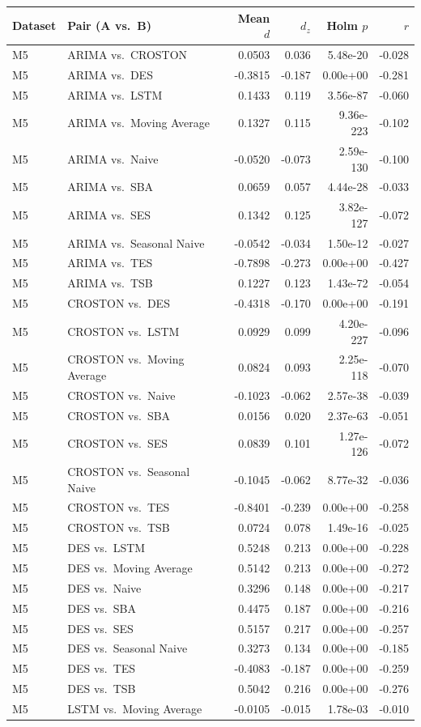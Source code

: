 {\scriptsize
\setlength\tabcolsep{4pt}
\begin{tabular}{llrrrr}
\toprule Dataset & Pair (A vs.~B) & Mean $d$ & $d_z$ & Holm $p$ & $r$ \\
\midrule
M5 & ARIMA vs.~CROSTON & 0.0503 & 0.036 & 5.48e-20 & -0.028 \\
M5 & ARIMA vs.~DES & -0.3815 & -0.187 & 0.00e+00 & -0.281 \\
M5 & ARIMA vs.~LSTM & 0.1433 & 0.119 & 3.56e-87 & -0.060 \\
M5 & ARIMA vs.~Moving Average & 0.1327 & 0.115 & 9.36e-223 & -0.102 \\
M5 & ARIMA vs.~Naive & -0.0520 & -0.073 & 2.59e-130 & -0.100 \\
M5 & ARIMA vs.~SBA & 0.0659 & 0.057 & 4.44e-28 & -0.033 \\
M5 & ARIMA vs.~SES & 0.1342 & 0.125 & 3.82e-127 & -0.072 \\
M5 & ARIMA vs.~Seasonal Naive & -0.0542 & -0.034 & 1.50e-12 & -0.027 \\
M5 & ARIMA vs.~TES & -0.7898 & -0.273 & 0.00e+00 & -0.427 \\
M5 & ARIMA vs.~TSB & 0.1227 & 0.123 & 1.43e-72 & -0.054 \\
M5 & CROSTON vs.~DES & -0.4318 & -0.170 & 0.00e+00 & -0.191 \\
M5 & CROSTON vs.~LSTM & 0.0929 & 0.099 & 4.20e-227 & -0.096 \\
M5 & CROSTON vs.~Moving Average & 0.0824 & 0.093 & 2.25e-118 & -0.070 \\
M5 & CROSTON vs.~Naive & -0.1023 & -0.062 & 2.57e-38 & -0.039 \\
M5 & CROSTON vs.~SBA & 0.0156 & 0.020 & 2.37e-63 & -0.051 \\
M5 & CROSTON vs.~SES & 0.0839 & 0.101 & 1.27e-126 & -0.072 \\
M5 & CROSTON vs.~Seasonal Naive & -0.1045 & -0.062 & 8.77e-32 & -0.036 \\
M5 & CROSTON vs.~TES & -0.8401 & -0.239 & 0.00e+00 & -0.258 \\
M5 & CROSTON vs.~TSB & 0.0724 & 0.078 & 1.49e-16 & -0.025 \\
M5 & DES vs.~LSTM & 0.5248 & 0.213 & 0.00e+00 & -0.228 \\
M5 & DES vs.~Moving Average & 0.5142 & 0.213 & 0.00e+00 & -0.272 \\
M5 & DES vs.~Naive & 0.3296 & 0.148 & 0.00e+00 & -0.217 \\
M5 & DES vs.~SBA & 0.4475 & 0.187 & 0.00e+00 & -0.216 \\
M5 & DES vs.~SES & 0.5157 & 0.217 & 0.00e+00 & -0.257 \\
M5 & DES vs.~Seasonal Naive & 0.3273 & 0.134 & 0.00e+00 & -0.185 \\
M5 & DES vs.~TES & -0.4083 & -0.187 & 0.00e+00 & -0.259 \\
M5 & DES vs.~TSB & 0.5042 & 0.216 & 0.00e+00 & -0.276 \\
M5 & LSTM vs.~Moving Average & -0.0105 & -0.015 & 1.78e-03 & -0.010 \\
\bottomrule
\end{tabular}}

